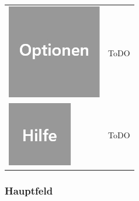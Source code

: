 \documentclass[parskip=full]{scrartcl}
\begin{document}
\begin{tabular}[t]{p{1cm} p{10cm}}
	\vspace{0cm}\includegraphics[width = 1 cm]{Grafik/Optionen.jpg} & ToDO\\
	\vspace{0cm}\includegraphics[width = 1 cm]{Grafik/Hilfe.jpg} & ToDO\\
\end{tabular}

\subsubsection{Hauptfeld}
\end{document}
